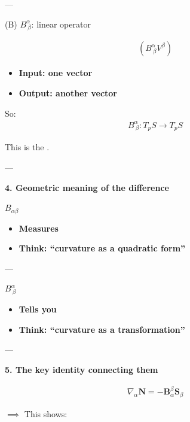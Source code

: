 \documentclass[12pt,a4paper]{report}
\begin{document}
\begin{description}
\begin{description}
\begin{description}
---

\item (B) $B^\alpha_{\ \beta}$: linear operator

\begin{align*}
(B^\alpha_{\ \beta} V^\beta)
\end{align*}

\begin{itemize}
\item \textbf{Input: one vector}
\item \textbf{Output: another vector}
\end{itemize}
\end{description}

So:
\begin{align*}
\boxed{
B^\alpha_{\ \beta} : T_pS \to T_pS
}
\end{align*}

This is the .

---

\item \textbf{4. Geometric meaning of the difference}

\item \textbf{$B_{\alpha\beta}$}

\begin{itemize}
\item \textbf{Measures }
\item \textbf{Think: “curvature as a quadratic form”}
\end{itemize}

---

\item \textbf{$B^\alpha_{\ \beta}$}

\begin{itemize}
\item \textbf{Tells you }
\item \textbf{Think: “curvature as a transformation”}
\end{itemize}

---

\item \textbf{5. The key identity connecting them}

\begin{align*}
\boxed{
\nabla_\alpha \mathbf{N} = -\textbf{B}^\beta_{\alpha} \mathbf{S}_\beta
  }
\end{align*}

$\implies$ This shows:


\end{description}
\end{description}
\end{document}
